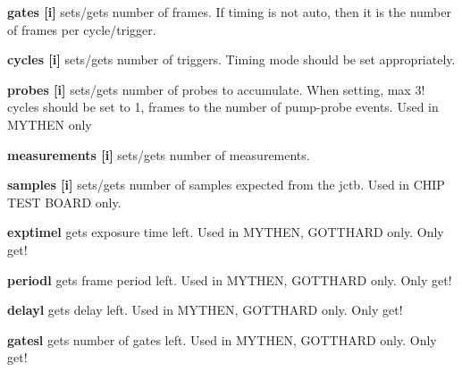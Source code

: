\begin{DoxyItemize}
\item {\bfseries gates \mbox{[}i\mbox{]}} sets/gets number of frames. If {\ttfamily timing} is not {\ttfamily auto}, then it is the number of frames per cycle/trigger.
\end{DoxyItemize}


\begin{DoxyItemize}
\item {\bfseries cycles \mbox{[}i\mbox{]}} sets/gets number of triggers. Timing mode should be set appropriately.
\end{DoxyItemize}


\begin{DoxyItemize}
\item {\bfseries probes \mbox{[}i\mbox{]}} sets/gets number of probes to accumulate. When setting, max 3! cycles should be set to 1, frames to the number of pump-\/probe events. Used in MYTHEN only
\end{DoxyItemize}


\begin{DoxyItemize}
\item {\bfseries measurements \mbox{[}i\mbox{]}} sets/gets number of measurements.
\end{DoxyItemize}


\begin{DoxyItemize}
\item {\bfseries samples \mbox{[}i\mbox{]}} sets/gets number of samples expected from the jctb. Used in CHIP TEST BOARD only.
\end{DoxyItemize}


\begin{DoxyItemize}
\item {\bfseries exptimel} gets exposure time left. Used in MYTHEN, GOTTHARD only. Only get!
\end{DoxyItemize}


\begin{DoxyItemize}
\item {\bfseries periodl} gets frame period left. Used in MYTHEN, GOTTHARD only. Only get!
\end{DoxyItemize}


\begin{DoxyItemize}
\item {\bfseries delayl} gets delay left. Used in MYTHEN, GOTTHARD only. Only get!
\end{DoxyItemize}


\begin{DoxyItemize}
\item {\bfseries gatesl} gets number of gates left. Used in MYTHEN, GOTTHARD only. Only get!
\end{DoxyItemize}


